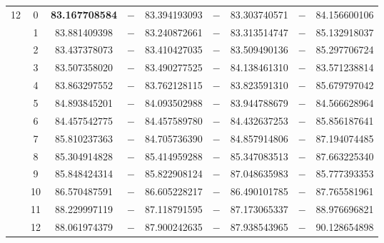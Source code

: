 \begin{table}[ht]
{\begin{tabular}{c|c|c|c|c|c|c|c|c}
\hline                    %
\multirow{13}{*}{12} & 0 & \textbf{83.167708584} & $-$ & 83.394193093 & $-$ & 83.303740571 & $-$ & 84.156600106 \\
& 1 & 83.881409398 & $-$ & 83.240872661 & $-$ & 83.313514747 & $-$ & 85.132918037 \\
& 2 & 83.437378073 & $-$ & 83.410427035 & $-$ & 83.509490136 & $-$ & 85.297706724 \\
& 3 & 83.507358020 & $-$ & 83.490277525 & $-$ & 84.138461310 & $-$ & 83.571238814 \\
& 4 & 83.863297552 & $-$ & 83.762128115 & $-$ & 83.823591310 & $-$ & 85.679797042 \\
& 5 & 84.893845201 & $-$ & 84.093502988 & $-$ & 83.944788679 & $-$ & 84.566628964 \\
& 6 & 84.457542775 & $-$ & 84.457589780 & $-$ & 84.432637253 & $-$ & 85.856187641 \\
& 7 & 85.810237363 & $-$ & 84.705736390 & $-$ & 84.857914806 & $-$ & 87.194074485 \\
& 8 & 85.304914828 & $-$ & 85.414959288 & $-$ & 85.347083513 & $-$ & 87.663225340 \\
& 9 & 85.848424314 & $-$ & 85.822908124 & $-$ & 87.048635983 & $-$ & 85.777393353 \\
& 10 & 86.570487591 & $-$ & 86.605228217 & $-$ & 86.490101785 & $-$ & 87.765581961 \\
& 11 & 88.229997119 & $-$ & 87.118791595 & $-$ & 87.173065337 & $-$ & 88.976696821 \\
& 12 & 88.061974379 & $-$ & 87.900242635 & $-$ & 87.938543965 & $-$ & 90.128654898 \\


\end{tabular}}
\end{table}
